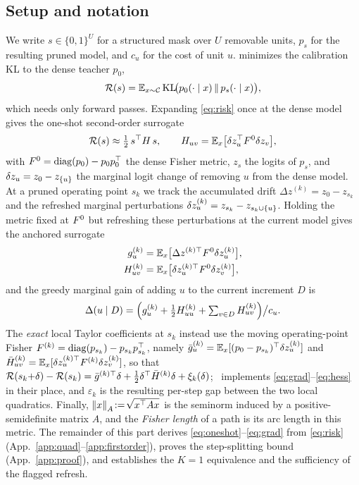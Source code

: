 \subsection{Setup and notation}
\label{app:setup-theory}
We write $s\in\{0,1\}^U$ for a structured mask over $U$ removable units, $p_s$ for the resulting pruned model, and $c_u$ for the cost of unit $u$.
\method minimizes the calibration KL to the dense teacher $p_0$,
\begin{equation}
\mathcal{R}(s)=\mathbb{E}_{x\sim\mathcal{C}}\,\mathrm{KL}\!\big(p_0(\cdot\mid x)\,\|\,p_s(\cdot\mid x)\big),
\label{eq:risk}
\end{equation}
which needs only forward passes.
Expanding \eqref{eq:risk} once at the dense model gives the one-shot second-order surrogate
\begin{equation}
\mathcal{R}(s)\approx\tfrac12\,s^\top H\,s,\qquad H_{uv}=\mathbb{E}_x\big[\delta z_u^\top F^0\delta z_v\big],
\label{eq:oneshot}
\end{equation}
with $F^0=\mathrm{diag}(p_0)-p_0p_0^\top$ the dense Fisher metric, $z_s$ the logits of $p_s$, and $\delta z_u=z_0-z_{\{u\}}$ the marginal logit change of removing $u$ from the dense model.
At a pruned operating point $s_k$ we track the accumulated drift $\Delta z^{(k)}=z_0-z_{s_k}$ and the refreshed marginal perturbations $\delta z^{(k)}_u=z_{s_k}-z_{s_k\cup\{u\}}$.
Holding the metric fixed at $F^0$ but refreshing these perturbations at the current model gives the anchored surrogate
\begin{align}
g^{(k)}_u&=\mathbb{E}_x\big[\Delta z^{(k)\top}F^0\delta z_u^{(k)}\big], \label{eq:grad}\\
H^{(k)}_{uv}&=\mathbb{E}_x\big[\delta z_u^{(k)\top}F^0\delta z_v^{(k)}\big], \label{eq:hess}
\end{align}
and the greedy marginal gain of adding $u$ to the current increment $D$ is
\begin{equation}
\Delta(u\mid D)=\Big(g^{(k)}_u+\tfrac12H^{(k)}_{uu}+\textstyle\sum_{v\in D}H^{(k)}_{uv}\Big)\big/c_u.
\label{eq:marginal}
\end{equation}
The \emph{exact} local Taylor coefficients at $s_k$ instead use the moving operating-point Fisher $F^{(k)}=\mathrm{diag}(p_{s_k})-p_{s_k}p_{s_k}^\top$, namely $\bar g^{(k)}_u=\mathbb{E}_x[(p_0-p_{s_k})^\top\delta z^{(k)}_u]$ and $\bar{H}^{(k)}_{uv}=\mathbb{E}_x[\delta z^{(k)\top}_uF^{(k)}\delta z^{(k)}_v]$, so that $\mathcal{R}(s_k{+}\delta)-\mathcal{R}(s_k)=\bar g^{(k)\top}\delta+\tfrac12\delta^\top\bar{H}^{(k)}\delta+\xi_k(\delta)$; \method\ implements \eqref{eq:grad}--\eqref{eq:hess} in their place, and $\varepsilon_k$ is the resulting per-step gap between the two local quadratics.
Finally, $\left\lVert x \right\rVert_{A}\!:=\!\sqrt{x^\top A x}$ is the seminorm induced by a positive-semidefinite matrix $A$, and the \emph{Fisher length} of a path is its arc length in this metric.
The remainder of this part derives \eqref{eq:oneshot}--\eqref{eq:grad} from \eqref{eq:risk} (App.~\ref{app:quad}--\ref{app:firstorder}), proves the step-splitting bound (App.~\ref{app:proof}), and establishes the $K{=}1$ equivalence and the sufficiency of the flagged refresh.

